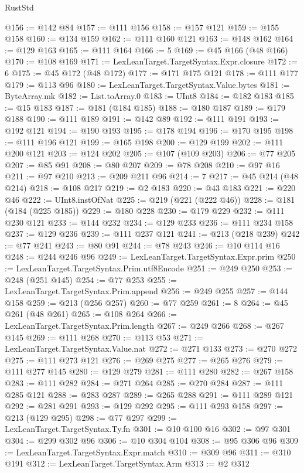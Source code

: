 \begin{lexlean}{RustStd}
\begin{coremodule}
@156 := @142 @84
@157 := @111 @156
@158 := @157 @121
@159 := @155 @158
@160 := @134 @159
@162 := @111 @160 @121
@163 := @148 @162
@164 := @129 @163
@165 := @111 @164
@166 := 5
@169 := @45 @166 (@48 @166)
@170 := @108 @169
@171 := LexLeanTarget.TargetSyntax.Expr.closure
@172 := 6
@175 := @45 @172 (@48 @172)
@177 := @171 @175 @121
@178 := @111 @177
@179 := @113 @96
@180 := LexLeanTarget.TargetSyntax.Value.bytes
@181 := ByteArray.mk
@182 := List.toArray.{0}
@183 := UInt8
@184 := @182 @183
@185 := @15 @183
@187 := @181 (@184 @185)
@188 := @180 @187
@189 := @179 @188
@190 := @111 @189
@191 := @142 @89
@192 := @111 @191
@193 := @192 @121
@194 := @190 @193
@195 := @178 @194
@196 := @170 @195
@198 := @111 @196 @121
@199 := @165 @198
@200 := @129 @199
@202 := @111 @200 @121
@203 := @124 @202
@205 := @107 (@109 @203)
@206 := @77 @205
@207 := @85 @91
@208 := @80 @207
@209 := @78 @208
@210 := @97 @16
@211 := @97 @210
@213 := @209 @211 @96
@214 := 7
@217 := @45 @214 (@48 @214)
@218 := @108 @217
@219 := @2 @183
@220 := @43 @183
@221 := @220 @46
@222 := UInt8.instOfNat
@225 := @219 (@221 (@222 @46))
@228 := @181 (@184 (@225 @185))
@229 := @180 @228
@230 := @179 @229
@232 := @111 @230 @121
@233 := @144 @232
@234 := @129 @233
@236 := @111 @234 @158
@237 := @129 @236
@239 := @111 @237 @121
@241 := @213 (@218 @239)
@242 := @77 @241
@243 := @80 @91
@244 := @78 @243
@246 := @10 @114 @16
@248 := @244 @246 @96
@249 := LexLeanTarget.TargetSyntax.Expr.prim
@250 := LexLeanTarget.TargetSyntax.Prim.utf8Encode
@251 := @249 @250
@253 := @248 (@251 @145)
@254 := @77 @253
@255 := LexLeanTarget.TargetSyntax.Prim.append
@256 := @249 @255
@257 := @144 @158
@259 := @213 (@256 @257)
@260 := @77 @259
@261 := 8
@264 := @45 @261 (@48 @261)
@265 := @108 @264
@266 := LexLeanTarget.TargetSyntax.Prim.length
@267 := @249 @266
@268 := @267 @145
@269 := @111 @268
@270 := @113 @53
@271 := LexLeanTarget.TargetSyntax.Value.nat
@272 := @271 @133
@273 := @270 @272
@275 := @111 @273 @121
@276 := @269 @275
@277 := @265 @276
@279 := @111 @277 @145
@280 := @129 @279
@281 := @111 @280
@282 := @267 @158
@283 := @111 @282
@284 := @271 @264
@285 := @270 @284
@287 := @111 @285 @121
@288 := @283 @287
@289 := @265 @288
@291 := @111 @289 @121
@292 := @281 @291
@293 := @129 @292
@295 := @111 @293 @158
@297 := @213 (@129 @295)
@298 := @77 @297
@299 := LexLeanTarget.TargetSyntax.Ty.fn
@301 := @10 @100 @16
@302 := @97 @301
@304 := @299 @302 @96
@306 := @10 @304 @104
@308 := @95 @306 @96
@309 := LexLeanTarget.TargetSyntax.Expr.match
@310 := @309 @96
@311 := @310 @191
@312 := LexLeanTarget.TargetSyntax.Arm
@313 := @2 @312

\end{coremodule}
\end{lexlean}
